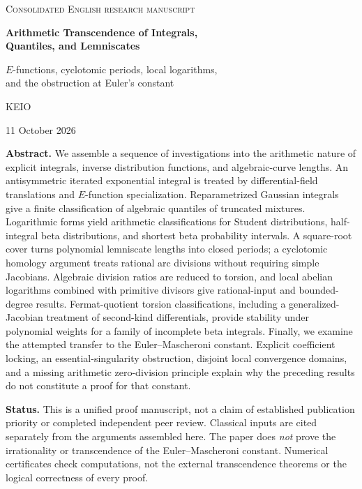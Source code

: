 \documentclass[11pt,a4paper]{article}
\numberwithin{equation}{section}
\theoremstyle{definition}
\theoremstyle{remark}
\begin{document}
\begin{titlepage}
\centering
\vspace*{9mm}
{\small\scshape Consolidated English research manuscript\par}
\vspace{15mm}
{\LARGE\bfseries Arithmetic Transcendence of Integrals,\\[4pt] Quantiles, and Lemniscates\par}
\vspace{7mm}
{\large $E$-functions, cyclotomic periods, local logarithms,\\[3pt]
and the obstruction at Euler's constant\par}
\vspace{12mm}
{\large KEIO\par}
\vspace{3mm}
{\normalsize 11 October 2026\par}
\vspace{12mm}
\begin{minipage}{0.93\textwidth}
\textbf{Abstract.}
We assemble a sequence of investigations into the arithmetic nature of explicit
integrals, inverse distribution functions, and algebraic-curve lengths. An
antisymmetric iterated exponential integral is treated by differential-field
translations and $E$-function specialization. Reparametrized Gaussian integrals
give a finite classification of algebraic quantiles of truncated mixtures.
Logarithmic forms yield arithmetic classifications for Student distributions,
half-integral beta distributions, and shortest beta probability intervals.
A square-root cover turns polynomial lemniscate lengths into closed periods;
a cyclotomic homology argument treats rational arc divisions without requiring
simple Jacobians. Algebraic division ratios are reduced to torsion, and local
abelian logarithms combined with primitive divisors give rational-input and
bounded-degree results. Fermat-quotient torsion classifications, including a
generalized-Jacobian treatment of second-kind differentials, provide stability
under polynomial weights for a family of incomplete beta integrals. Finally,
we examine the attempted transfer to the Euler--Mascheroni constant. Explicit
coefficient locking, an essential-singularity obstruction, disjoint local
convergence domains, and a missing arithmetic zero-division principle explain
why the preceding results do not constitute a proof for that constant.

\medskip
\textbf{Status.} This is a unified proof manuscript, not a claim of established
publication priority or completed independent peer review. Classical inputs
are cited separately from the arguments assembled here. The paper does
\emph{not} prove the irrationality or transcendence of the Euler--Mascheroni
constant. Numerical certificates check computations, not the external
transcendence theorems or the logical correctness of every proof.


\end{minipage}
\end{titlepage}
\end{document}

